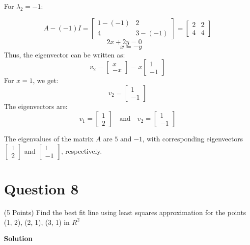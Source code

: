 \documentclass{article}
\begin{document}
For \(\lambda_2 = -1\):

\[
A - (-1)I = \begin{bmatrix}1 - (-1) & 2 \\ 4 & 3 - (-1)\end{bmatrix} = \begin{bmatrix}2 & 2 \\ 4 & 4\end{bmatrix}
\]
\[ 2x + 2y = 0 \quad \]
\[ \quad x = -y \]
Thus, the eigenvector can be written as:
\[
v_2 = \begin{bmatrix}x \\ -x\end{bmatrix} = x \begin{bmatrix}1 \\ -1\end{bmatrix}
\]
For \(x = 1\), we get:
\[
v_2 = \begin{bmatrix}1 \\ -1\end{bmatrix}
\]
The eigenvectors are:
\[
v_1 = \begin{bmatrix}1 \\ 2\end{bmatrix} \quad \text{and} \quad v_2 = \begin{bmatrix}1 \\ -1\end{bmatrix}
\]

The eigenvalues of the matrix \( A \) are \(\boxed{5}\) and \(\boxed{-1}\), with corresponding eigenvectors \(\boxed{\begin{bmatrix}1 \\ 2\end{bmatrix}}\) and \(\boxed{\begin{bmatrix}1 \\ -1\end{bmatrix}}\), respectively.

\vfill\break\noindent
\section*{Question 8} (5 Points) Find the best fit line using least squares approximation for the points (1, 2), (2, 1), (3, 1) in $R^2$

\textbf{Solution}
\end{document}
